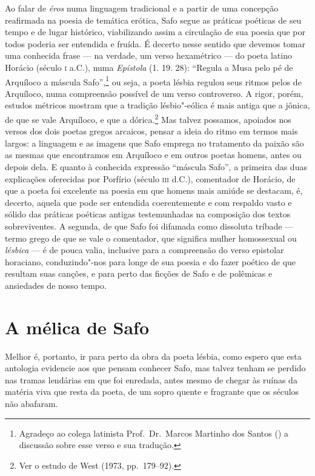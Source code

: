 Ao falar de \textit{éros} numa linguagem tradicional e a partir de uma concepção
reafirmada na poesia de temática erótica, Safo segue as práticas poéticas de
seu tempo e de lugar histórico, viabilizando assim a circulação de sua poesia
que por todos poderia ser entendida e fruída. É decerto nesse sentido que
devemos tomar uma conhecida frase --- na verdade, um verso hexamétrico --- do poeta
latino Horácio (século \textsc{i} a.C.), numa \textit{Epístola} (1. 19. 28):
``Regula a Musa pelo pé de Arquíloco a máscula Safo”,\footnote{ Agradeço
ao colega latinista Prof.~Dr.~Marcos Martinho dos Santos () a discussão sobre esse verso e
sua tradução.} ou seja, a poeta lésbia regulou seus ritmos pelos de Arquíloco,
numa compreensão possível de um verso controverso. A rigor, porém,
estudos métricos mostram que a tradição lésbio"-eólica é mais antiga que a
jônica, de que se vale Arquíloco, e que a dórica.\footnote{ Ver o estudo de West
(1973, pp.~179--92).} Mas talvez possamos, apoiados nos versos dos dois poetas
gregos arcaicos, pensar a ideia do ritmo em termos mais largos: a linguagem e
as imagens que Safo emprega no tratamento da paixão são as mesmas que
encontramos em Arquíloco e em outros poetas homens, antes ou depois dela. E
quanto à conhecida expressão ``máscula Safo”, a primeira das duas
explicações oferecidas por Porfírio (século \textsc{iii} d.C.), comentador de Horácio,
de que a poeta foi excelente na poesia em que homens mais amiúde se
destacam, é, decerto, aquela que pode ser entendida coerentemente e com
respaldo vasto e sólido das práticas poéticas antigas testemunhadas na
composição dos textos sobreviventes. A segunda, de que Safo foi difamada como
dissoluta tríbade --- termo grego de que se vale o comentador, que significa
mulher homossexual ou \textit{lésbica} --- é de pouca valia, inclusive para a
compreensão do verso epistolar horaciano, conduzindo"-nos para longe de sua
poesia e do fazer poético de que resultam suas canções, e para perto das
ficções de Safo e de polêmicas e ansiedades de nosso tempo. 


\section*{A mélica de Safo}

Melhor é, portanto, ir para perto da obra da poeta lésbia, como espero que esta
antologia evidencie aos que pensam conhecer Safo, mas talvez tenham se perdido
nas tramas lendárias em que foi enredada, antes mesmo de chegar às ruínas da
matéria viva que resta da poeta, de um sopro quente e fragrante que os séculos
não abafaram.


